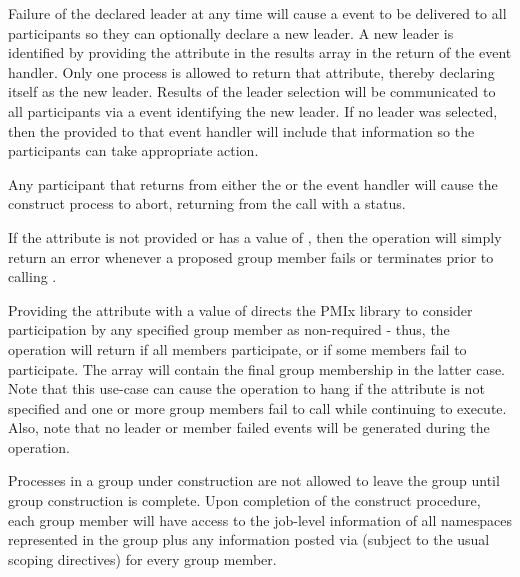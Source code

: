 Failure of the declared leader at any time will cause a  event to be delivered to all participants so they can optionally declare a new leader. A new leader is identified by providing the  attribute in the results array in the return of the event handler. Only one process is allowed to return that attribute, thereby declaring itself as the new leader. Results of the leader selection will be communicated to all participants via a  event identifying the new leader. If no leader was selected, then the  provided to that event handler will include that information so the participants can take appropriate action.

Any participant that returns  from either the  or the  event handler will cause the construct process to abort, returning from the call with a  status.

If the  attribute is not provided or has a value of , then the  operation will simply return an error whenever a proposed group member fails or terminates prior to calling .

Providing the  attribute with a value of  directs the \ac{PMIx} library to consider participation by any specified group member as non-required - thus, the operation will return  if all members participate, or  if some members fail to participate. The  array will contain the final group membership in the latter case. Note that this use-case can cause the operation to hang if the  attribute is not specified and one or more group members fail to call  while continuing to execute. Also, note that no leader or member failed events will be generated during the operation.

Processes in a group under construction are not allowed to leave the group until group construction is complete. Upon completion of the construct procedure, each group member will have access to the job-level information of all namespaces represented in the group plus any information posted via  (subject to the usual scoping directives) for every group member.

